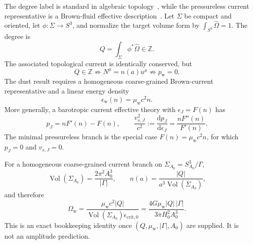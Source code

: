 \documentclass[
  aps,
  prd,
  reprint,
  superscriptaddress,
  floatfix,
  nofootinbib,
  longbibliography
]{revtex4-2}
\theoremstyle{plain}
\theoremstyle{definition}
\theoremstyle{remark}
\newcommand{\dd}{\mathrm d}
\newcommand{\wind}{\mathrm w}
\newcommand{\crit}{\mathrm{crit}}
\newcommand{\Ow}{\Omega_{\mathrm w}}
\DeclareMathOperator{\Vol}{Vol}
\newcommand{\Z}{\mathbb Z}
\newcommand{\eps}{\epsilon}
\begin{document}
The degree label is standard in algebraic topology~\cite{Hatcher}, while the
pressureless current representative is a Brown-fluid effective
description~\cite{BrownFluid}.  Let \(\Sigma\) be compact and oriented, let
\(\phi:\Sigma\to S^3\), and normalize the target volume form by
\(\int_{S^3}\widehat\Omega=1\).  The degree is
\begin{equation}
Q=\int_\Sigma \phi^*\widehat\Omega\in\Z .
\label{eq:degree_v5}
\end{equation}
The associated topological current is identically conserved, but
\begin{equation}
Q\in\Z\not\Rightarrow N^\mu=n(a)u^\mu\not\Rightarrow p_{\wind}=0 .
\label{eq:q_not_dust_v5}
\end{equation}
The dust result requires a homogeneous coarse-grained Brown-current
representative and a linear energy density
\begin{equation}
\eps_{\wind}(n)=\mu_{\wind}c^2n .
\label{eq:linear_current_v5}
\end{equation}
More generally, a barotropic current effective theory with
\(\eps_J=F(n)\) has
\begin{equation}
p_J=nF'(n)-F(n),
\qquad
\frac{v_{s,J}^2}{c^2}:=\frac{\dd p_J}{\dd\eps_J}
=\frac{nF''(n)}{F'(n)} .
\label{eq:current_atlas_v5}
\end{equation}
The minimal pressureless branch is the special case \(F(n)=\mu_{\wind}c^2n\),
for which \(p_J=0\) and \(v_{s,J}=0\).

For a homogeneous coarse-grained current branch on
\(\Sigma_{A_0}=S^3_{A_0}/\Gamma\),
\begin{equation}
\Vol(\Sigma_{A_0})=\frac{2\pi^2A_0^3}{|\Gamma|},
\qquad
n(a)=\frac{|Q|}{a^3\Vol(\Sigma_{A_0})},
\label{eq:volume_number_density_v5}
\end{equation}
and therefore
\begin{equation}
\Ow=
\frac{\mu_{\wind}c^2|Q|}{\Vol(\Sigma_{A_0})\eps_{\crit,0}}
=
\frac{4G\mu_{\wind}|Q|\,|\Gamma|}{3\pi H_0^2A_0^3} .
\label{eq:omega_w_v5}
\end{equation}
This is an exact bookkeeping identity once \((Q,\mu_{\wind},|\Gamma|,A_0)\)
are supplied.  It is not an amplitude prediction.
\end{document}

